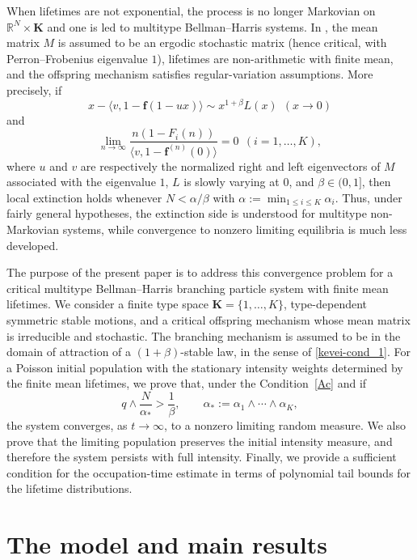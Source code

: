 \documentclass[reqno,final,11pt]{amsart}
\newcommand{\R}{\mathbb{R}}
\newcommand{\1}{\mathbbm{1}}
\renewcommand{\cite}{\citet}
\theoremstyle{plain}
\theoremstyle{definition}
\theoremstyle{remark}
\def\R{\mathbb{R}}
\begin{document}
When lifetimes are not exponential, the process is no longer Markovian on $\R^N\times\mathbf K$ and one is led to multitype Bellman--Harris systems. In \cite{Kevei}, the mean matrix $M$ is assumed to be an ergodic stochastic matrix (hence critical, with Perron--Frobenius eigenvalue $1$), lifetimes are non-arithmetic with finite mean, and the offspring mechanism satisfies regular-variation assumptions. More precisely, if
\begin{equation}\label{kevei-cond_1}
x-\langle v,1-\mathbf f(1-ux)\rangle\sim x^{1+\beta}L(x)\ \ (x\to0)
\end{equation}
and
\begin{equation}\label{kevei-cond_2}
\lim_{n\to\infty}\frac{n(1-F_i(n))}{\langle v,1-\mathbf f^{(n)}(0)\rangle}=0\ \ (i=1,\dots,K),
\end{equation}
where \(u\) and \(v\) are respectively the normalized right and left eigenvectors of
\(M\) associated with the eigenvalue \(1\), \(L\) is slowly varying at \(0\), and
\(\beta\in(0,1]\), then local extinction holds whenever $N<\alpha/\beta$ with $\alpha:=\min_{1\le i\le K}\alpha_i$. Thus, under fairly general hypotheses, the extinction side is understood for multitype non-Markovian systems, while convergence to nonzero limiting equilibria is much less developed.

The purpose of the present paper is to address this convergence problem for a
critical multitype Bellman--Harris branching particle system with finite mean
lifetimes. We consider a finite type space \(\mathbf K=\{1,\dots,K\}\), type-dependent
symmetric stable motions, and a critical offspring mechanism whose mean matrix is
irreducible and stochastic. The branching mechanism is assumed to be in the domain
of attraction of a \((1+\beta)\)-stable law, in the sense of \eqref{kevei-cond_1}.
For a Poisson initial population with the stationary intensity weights determined by
the finite mean lifetimes, we prove that, under the Condition~\ref{Ac} and if
\[
q\wedge \frac{N}{\alpha_*}>\frac1\beta,
\qquad
\alpha_*:=\alpha_1\wedge\cdots\wedge\alpha_K,
\]
the system converges, as \(t\to\infty\), to a nonzero limiting random measure. We
also prove that the limiting population preserves the initial intensity measure, and
therefore the system persists with full intensity. Finally, we provide a sufficient
condition for the occupation-time estimate in terms of polynomial tail bounds for
the lifetime distributions.

\section{The model and main results}\label{results}
\end{document}
